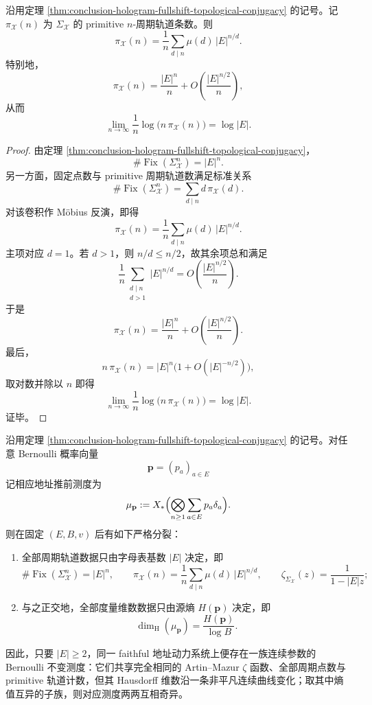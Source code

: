 \begin{corollary}\label{cor:conclusion-hologram-fullshift-primitive-orbit-prime-law}
沿用定理 \ref{thm:conclusion-hologram-fullshift-topological-conjugacy} 的记号。记 \(\pi_{\mathcal X}(n)\) 为 \(\Sigma_{\mathcal X}\) 的 primitive \(n\)-周期轨道条数。则
\[
\boxed{\;
\pi_{\mathcal X}(n)
=
\frac1n\sum_{d\mid n}\mu(d)\,|E|^{n/d}.\;}
\]
特别地，
\[
\boxed{\;
\pi_{\mathcal X}(n)
=
\frac{|E|^n}{n}
+O\!\left(\frac{|E|^{n/2}}{n}\right),\;}
\]
从而
\[
\boxed{\;
\lim_{n\to\infty}\frac1n\log\bigl(n\,\pi_{\mathcal X}(n)\bigr)=\log|E|.\;}
\]
\end{corollary}
\begin{proof}
由定理 \ref{thm:conclusion-hologram-fullshift-topological-conjugacy}，
\[
\#\operatorname{Fix}(\Sigma_{\mathcal X}^n)=|E|^n.
\]
另一方面，固定点数与 primitive 周期轨道数满足标准关系
\[
\#\operatorname{Fix}(\Sigma_{\mathcal X}^n)
=
\sum_{d\mid n} d\,\pi_{\mathcal X}(d).
\]
对该卷积作 Möbius 反演，即得
\[
\pi_{\mathcal X}(n)=\frac1n\sum_{d\mid n}\mu(d)\,|E|^{n/d}.
\]
主项对应 \(d=1\)。若 \(d>1\)，则 \(n/d\le n/2\)，故其余项总和满足
\[
\frac1n\sum_{\substack{d\mid n\\ d>1}}|E|^{n/d}
=
O\!\left(\frac{|E|^{n/2}}{n}\right).
\]
于是
\[
\pi_{\mathcal X}(n)
=
\frac{|E|^n}{n}
+O\!\left(\frac{|E|^{n/2}}{n}\right).
\]
最后，
\[
n\,\pi_{\mathcal X}(n)=|E|^n\bigl(1+O(|E|^{-n/2})\bigr),
\]
取对数并除以 \(n\) 即得
\[
\lim_{n\to\infty}\frac1n\log\bigl(n\,\pi_{\mathcal X}(n)\bigr)=\log|E|.
\]
证毕。
\end{proof}

\begin{theorem}\label{thm:conclusion-hologram-orbit-spectrum-metric-dimension-decoupling}
沿用定理 \ref{thm:conclusion-hologram-fullshift-topological-conjugacy} 的记号。对任意 Bernoulli 概率向量
\[
\mathbf p=(p_a)_{a\in E}
\]
记相应地址推前测度为
\[
\mu_{\mathbf p}:=X_*\Bigl(\bigotimes_{n\ge 1}\sum_{a\in E}p_a\delta_a\Bigr).
\]
则在固定 \((E,B,v)\) 后有如下严格分裂：
\begin{enumerate}
  \item 全部周期轨道数据只由字母表基数 \(|E|\) 决定，即
        \[
        \#\operatorname{Fix}(\Sigma_{\mathcal X}^n)=|E|^n,
        \qquad
        \pi_{\mathcal X}(n)=\frac1n\sum_{d\mid n}\mu(d)\,|E|^{n/d},
        \qquad
        \zeta_{\Sigma_{\mathcal X}}(z)=\frac{1}{1-|E|z};
        \]
  \item 与之正交地，全部度量维数数据只由源熵 \(H(\mathbf p)\) 决定，即
        \[
        \dim_{\mathrm H}(\mu_{\mathbf p})=\frac{H(\mathbf p)}{\log B}.
        \]
\end{enumerate}
因此，只要 \(|E|\ge 2\)，同一 faithful 地址动力系统上便存在一族连续参数的 Bernoulli 不变测度：它们共享完全相同的 Artin--Mazur \(\zeta\) 函数、全部周期点数与 primitive 轨道计数，但其 Hausdorff 维数沿一条非平凡连续曲线变化；取其中熵值互异的子族，则对应测度两两互相奇异。
\end{theorem}

